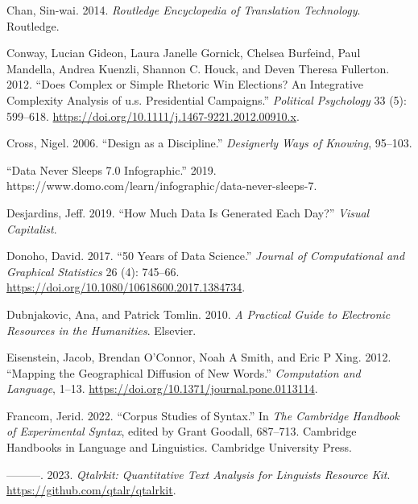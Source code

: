 \documentclass[
  letterpaper,
  DIV=11,
  numbers=noendperiod]{scrreport}
\newlength{\cslhangindent}
\newlength{\cslentryspacingunit} %
\newenvironment{CSLReferences}[2] %
 {%
  \setlength{\parindent}{0pt}
  \ifodd #1
  \let\oldpar\par
  \def\par{\hangindent=\cslhangindent\oldpar}
  \fi
  \setlength{\parskip}{#2\cslentryspacingunit}
 }%
 {}
\theoremstyle{definition}
\theoremstyle{remark}
\begin{document}
\begin{CSLReferences}{1}{0}
\leavevmode{}%
Chan, Sin-wai. 2014. \emph{Routledge Encyclopedia of Translation
Technology}. Routledge.

\leavevmode{}%
Conway, Lucian Gideon, Laura Janelle Gornick, Chelsea Burfeind, Paul
Mandella, Andrea Kuenzli, Shannon C. Houck, and Deven Theresa Fullerton.
2012. {``Does Complex or Simple Rhetoric Win Elections? An Integrative
Complexity Analysis of u.s. Presidential Campaigns.''} \emph{Political
Psychology} 33 (5): 599--618.
\url{https://doi.org/10.1111/j.1467-9221.2012.00910.x}.

\leavevmode{}%
Cross, Nigel. 2006. {``Design as a Discipline.''} \emph{Designerly Ways
of Knowing}, 95--103.

\leavevmode{}%
{``Data Never Sleeps 7.0 Infographic.''} 2019.
https://www.domo.com/learn/infographic/data-never-sleeps-7.

\leavevmode{}%
Desjardins, Jeff. 2019. {``How Much Data Is Generated Each Day?''}
\emph{Visual Capitalist}.

\leavevmode{}%
Donoho, David. 2017. {``50 Years of Data Science.''} \emph{Journal of
Computational and Graphical Statistics} 26 (4): 745--66.
\url{https://doi.org/10.1080/10618600.2017.1384734}.

\leavevmode{}%
Dubnjakovic, Ana, and Patrick Tomlin. 2010. \emph{A Practical Guide to
Electronic Resources in the Humanities}. Elsevier.

\leavevmode{}%
Eisenstein, Jacob, Brendan O'Connor, Noah A Smith, and Eric P Xing.
2012. {``Mapping the Geographical Diffusion of New Words.''}
\emph{Computation and Language}, 1--13.
\url{https://doi.org/10.1371/journal.pone.0113114}.

\leavevmode{}%
Francom, Jerid. 2022. {``Corpus Studies of Syntax.''} In \emph{The
Cambridge Handbook of Experimental Syntax}, edited by Grant Goodall,
687--713. Cambridge Handbooks in Language and Linguistics. Cambridge
University Press.

\leavevmode{}%
---------. 2023. \emph{Qtalrkit: Quantitative Text Analysis for
Linguists Resource Kit}. \url{https://github.com/qtalr/qtalrkit}.


\end{CSLReferences}
\end{document}
